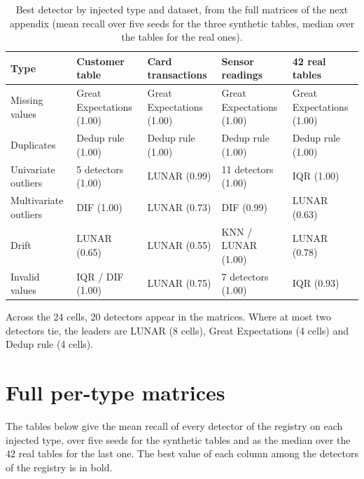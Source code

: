 \documentclass[conference]{IEEEtran}
\begin{document}
\begin{table}[t]
\caption{Best detector by injected type and dataset, from the full matrices of the
next appendix (mean recall over five seeds for the three synthetic tables, median over
the tables for the real ones).}
\label{tab:compact}
\centering
\footnotesize
\setlength{\tabcolsep}{4pt}
\begin{tabular}{lllll}
\toprule
Type & Customer table & Card transactions & Sensor readings & 42 real tables \\
\midrule
Missing values & Great Expectations (1.00) & Great Expectations (1.00) & Great Expectations (1.00) & Great Expectations (1.00) \\
Duplicates & Dedup rule (1.00) & Dedup rule (1.00) & Dedup rule (1.00) & Dedup rule (1.00) \\
Univariate outliers & 5 detectors (1.00) & LUNAR (0.99) & 11 detectors (1.00) & IQR (1.00) \\
Multivariate outliers & DIF (1.00) & LUNAR (0.73) & DIF (0.99) & LUNAR (0.63) \\
Drift & LUNAR (0.65) & LUNAR (0.55) & KNN / LUNAR (1.00) & LUNAR (0.78) \\
Invalid values & IQR / DIF (1.00) & LUNAR (0.75) & 7 detectors (1.00) & IQR (0.93) \\
\bottomrule
\end{tabular}
\end{table}

Across the 24 cells, 20 detectors appear in the matrices. Where at most two detectors tie, the leaders are LUNAR (8 cells), Great Expectations (4 cells) and Dedup rule (4 cells).

\section{Full per-type matrices}
\label{app:matrices}
The tables below give the mean recall of every detector of the registry on each injected type, over five seeds for the synthetic tables and as the median over the $42$ real tables for the last one. The best value of each column among the detectors of the registry is in bold.
\end{document}
